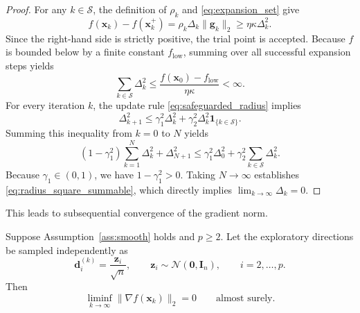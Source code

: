 \documentclass{siamart171218}
\newcommand{\bx}{\bm{x}}
\newcommand{\bd}{\bm{d}}
\newcommand{\bg}{\bm{g}}
\newcommand{\bz}{\bm{z}}
\begin{document}
\begin{proof}
For any $k \in \mathcal S$, the definition of $\rho_k$ and \eqref{eq:expansion_set} give
\[
f(\bx_k)-f(\bx_k^+) = \rho_k\Delta_k\|\bg_k\|_2 \ge \eta\kappa\Delta_k^2.
\]
Since the right-hand side is strictly positive, the trial point is accepted. Because $f$ is bounded below by a finite constant $f_{\mathrm{low}}$, summing over all successful expansion steps yields
\[
\sum_{k\in\mathcal S}\Delta_k^2 \le \frac{f(\bx_0)-f_{\mathrm{low}}}{\eta\kappa} < \infty.
\]
For every iteration $k$, the update rule \eqref{eq:safeguarded_radius} implies
\[
\Delta_{k+1}^2 \le \gamma_1^2\Delta_k^2 + \gamma_2^2\Delta_k^2\mathbf{1}_{\{k\in\mathcal S\}}.
\]
Summing this inequality from $k=0$ to $N$ yields
\[
(1-\gamma_1^2) \sum_{k=1}^{N}\Delta_k^2 + \Delta_{N+1}^2 \le \gamma_1^2\Delta_0^2 + \gamma_2^2 \sum_{k\in\mathcal S}\Delta_k^2.
\]
Because $\gamma_1\in(0,1)$, we have $1-\gamma_1^2 > 0$. Taking $N\to\infty$ establishes \eqref{eq:radius_square_summable}, which directly implies $\lim_{k\to\infty}\Delta_k = 0$.
\end{proof}

This leads to subsequential convergence of the gradient norm.

\begin{theorem}
\label{thm:liminf_convergence}
Suppose Assumption~\ref{ass:smooth} holds and $p\ge2$. Let the exploratory directions be sampled independently as
\[
\bd_i^{(k)} = \frac{\bz_i}{\sqrt n}, \qquad \bz_i\sim\mathcal N(\bm0,\bm I_n), \qquad i=2,\ldots,p.
\]
Then
\begin{equation}
\label{eq:liminf_gradient}
\liminf_{k\to\infty} \|\nabla f(\bx_k)\|_2 = 0 \qquad \text{almost surely}.
\end{equation}
\end{theorem}
\end{document}
